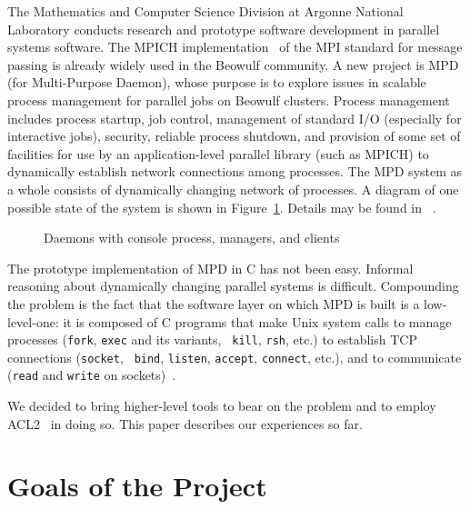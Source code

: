 \documentclass{article}
\begin{document}
The Mathematics and Computer Science Division at Argonne National Laboratory
conducts research and prototype software development in parallel
systems software.  The MPICH
implementation~\cite{gropp-lusk-doss-skjellum:mpich} of the MPI standard for
message passing is already widely used in the Beowulf community.  A new
project is MPD (for Multi-Purpose Daemon), whose purpose is to explore issues
in scalable process management for parallel jobs on Beowulf clusters.  Process
management includes process startup, job control, management of standard I/O
(especially for interactive jobs), security, reliable process shutdown, and
provision of some set of facilities for use by an application-level parallel
library (such as MPICH) to dynamically establish network connections among
processes.  The MPD system as a whole consists of dynamically changing network
of processes. A diagram of one possible state of the system is shown in
Figure~\ref{fig:mpds-all}.  Details may be found in ~\cite{mpd-short}.
\begin{figure}[htbp]
    \centerline{
      \epsfxsize=5.0in
    }
    \caption{Daemons with console process, managers, and clients}
    \label{fig:mpds-all}
\end{figure}

The prototype implementation of MPD in C has not been easy.  Informal
reasoning about dynamically changing parallel systems is difficult.
Compounding the problem is the fact that the software layer on which MPD is
built is a low-level-one: it is composed of C programs that make Unix system
calls to manage processes ({\tt fork}, {\tt exec} and its variants, {\tt
  kill}, {\tt rsh}, etc.) to establish TCP connections ({\tt socket}, {\tt
  bind}, {\tt listen}, {\tt accept}, {\tt connect}, etc.), and to communicate
({\tt read} and {\tt write} on sockets)~\cite{linux-man-pages}.

We decided to bring higher-level tools to bear on the problem and to employ
ACL2~\cite{acl2-approach} in doing so.  This paper describes our experiences
so far.

\section{Goals of the Project}
\label{sec:goals}
\end{document}
